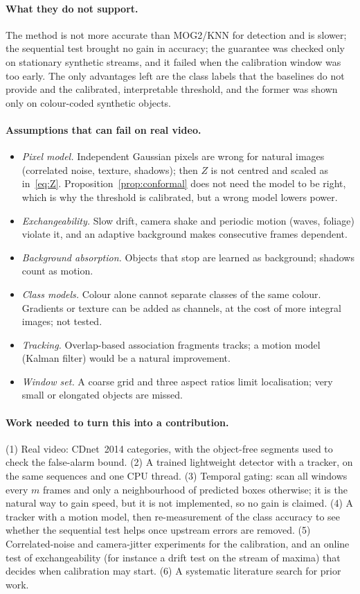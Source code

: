 \documentclass[11pt,a4paper]{article}
\theoremstyle{definition}
\begin{document}
\paragraph{What they do not support.}
The method is not more accurate than MOG2/KNN for detection and is slower; the sequential test brought no gain in accuracy; the guarantee was checked only on stationary synthetic streams, and it failed when the calibration window was too early.
The only advantages left are the class labels that the baselines do not provide and the calibrated, interpretable threshold, and the former was shown only on colour-coded synthetic objects.

\paragraph{Assumptions that can fail on real video.}
\begin{itemize}[leftmargin=*,itemsep=2pt]
\item \emph{Pixel model.} Independent Gaussian pixels are wrong for natural images (correlated noise, texture, shadows); then $Z$ is not centred and scaled as in~\eqref{eq:Z}. Proposition~\ref{prop:conformal} does not need the model to be right, which is why the threshold is calibrated, but a wrong model lowers power.
\item \emph{Exchangeability.} Slow drift, camera shake and periodic motion (waves, foliage) violate it, and an adaptive background makes consecutive frames dependent.
\item \emph{Background absorption.} Objects that stop are learned as background; shadows count as motion.
\item \emph{Class models.} Colour alone cannot separate classes of the same colour. Gradients or texture can be added as channels, at the cost of more integral images; not tested.
\item \emph{Tracking.} Overlap-based association fragments tracks; a motion model (Kalman filter) would be a natural improvement.
\item \emph{Window set.} A coarse grid and three aspect ratios limit localisation; very small or elongated objects are missed.
\end{itemize}

\paragraph{Work needed to turn this into a contribution.}
(1) Real video: CDnet~2014 categories, with the object-free segments used to check the false-alarm bound. (2) A trained lightweight detector with a tracker, on the same sequences and one CPU thread. (3) Temporal gating: scan all windows every $m$ frames and only a neighbourhood of predicted boxes otherwise; it is the natural way to gain speed, but it is not implemented, so no gain is claimed. (4) A tracker with a motion model, then re-measurement of the class accuracy to see whether the sequential test helps once upstream errors are removed. (5) Correlated-noise and camera-jitter experiments for the calibration, and an online test of exchangeability (for instance a drift test on the stream of maxima) that decides when calibration may start. (6) A systematic literature search for prior work.
\end{document}
